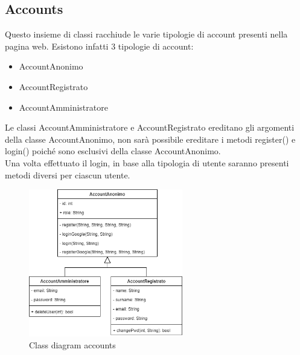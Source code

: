 \documentclass[a4paper,12pt]{article}
\begin{document}
\subsection{Accounts}
Questo insieme di classi racchiude le varie tipologie di account presenti nella pagina web. Esistono infatti 3 tipologie di account:
\begin{itemize}
    \item AccountAnonimo
    \item AccountRegistrato
    \item AccountAmministratore
\end{itemize} 
Le classi AccountAmministratore e AccountRegistrato ereditano gli argomenti della classe AccountAnonimo, non sarà possibile ereditare i metodi register() e login() poiché sono esclusivi della classe AccountAnonimo.\\
Una volta effettuato il login, in base alla tipologia di utente saranno presenti metodi diversi per ciascun utente.
\begin{figure}[H]
   \centering    \includegraphics[width=0.6\textwidth]{D3/img/class_diagram_accounts.png}
    \caption{Class diagram accounts}
\end{figure}

\newpage
\end{document}
